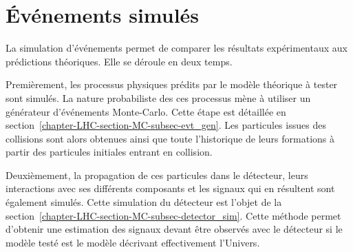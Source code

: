 \section{Événements simulés}\label{chapter-LHC-section-MC}
La simulation d'événements permet de comparer les résultats expérimentaux aux prédictions théoriques.
Elle se déroule en deux temps.
\par Premièrement, les processus physiques prédits par le modèle théorique à tester sont simulés.
La nature probabiliste des ces processus mène à utiliser un générateur d'événements Monte-Carlo.
Cette étape est détaillée en section~\ref{chapter-LHC-section-MC-subsec-evt_gen}.
Les particules issues des collisions sont alors obtenues ainsi que toute l'historique de leurs formations à partir des particules initiales entrant en collision.
\par Deuxièmement, la propagation de ces particules dans le détecteur, leurs interactions avec ses différents composants et les signaux qui en résultent sont également simulés.
Cette simulation du détecteur est l'objet de la section~\ref{chapter-LHC-section-MC-subsec-detector_sim}.
Cette méthode permet d'obtenir une estimation des signaux devant être observés avec le détecteur si le modèle testé est le modèle décrivant effectivement l'Univers.
